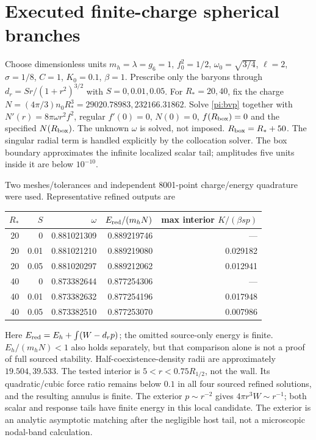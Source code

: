 \documentclass[11pt]{article}
\begin{document}
\section{Executed finite-charge spherical branches}
Choose dimensionless units $m_h=\lambda=g_6=1$,
$f_0^2=1/2$, $\omega_0=\sqrt{3/4}$, $\ell=2$, $\sigma=1/8$,
$C=1$, $K_0=0.1$, $\beta=1$. Prescribe only the baryons through
$d_r=S r/(1+r^2)^{3/2}$ with $S=0,0.01,0.05$.
For $R_*=20,40$, fix the charge
$N=(4\pi/3)n_0R_*^3=29020.78983,232166.31862$.
Solve \eqref{pi:bvp} together with $N'(r)=8\pi\omega r^2f^2$,
regular $f'(0)=0$, $N(0)=0$, $f(R_{\rm box})=0$ and the specified
$N(R_{\rm box})$. The unknown $\omega$ is solved, not imposed.
$R_{\rm box}=R_*+50$. The singular radial term is handled explicitly
by the collocation solver. The box boundary approximates the infinite
localized scalar tail; amplitudes five units inside it are below $10^{-10}$.

Two meshes/tolerances and independent 8001-point charge/energy quadrature
were used. Representative refined outputs are
\begin{center}
\begin{tabular}{rrrrr}
\toprule
$R_*$ & $S$ & $\omega$ & $E_{\rm red}/(m_h N)$ & max interior $K/(\beta s p)$\\
\midrule
20 & 0 & 0.881021309 & 0.889219746 & ---\\
20 & 0.01 & 0.881021210 & 0.889219080 & 0.029182\\
20 & 0.05 & 0.881020297 & 0.889212062 & 0.012941\\
40 & 0 & 0.873382644 & 0.877254306 & ---\\
40 & 0.01 & 0.873382632 & 0.877254196 & 0.017948\\
40 & 0.05 & 0.873382510 & 0.877253070 & 0.007986\\
\bottomrule
\end{tabular}
\end{center}
Here $E_{\rm red}=E_h+\int(W-d_rp)$; the omitted source-only energy
is finite. $E_h/(m_hN)<1$ also holds separately, but that comparison
alone is not a proof of full sourced stability. Half-coexistence-density
radii are approximately $19.504,39.533$. The tested interior is
$5<r<0.75R_{1/2}$, not the wall. Its quadratic/cubic force ratio remains
below $0.1$ in all four sourced refined solutions, and the resulting
annulus is finite. The exterior $p\sim r^{-2}$ gives
$4\pi r^3W\sim r^{-1}$; both scalar and response tails have finite energy
in this local candidate. The exterior is an analytic asymptotic matching
after the negligible host tail, not a microscopic nodal-band calculation.
\end{document}
